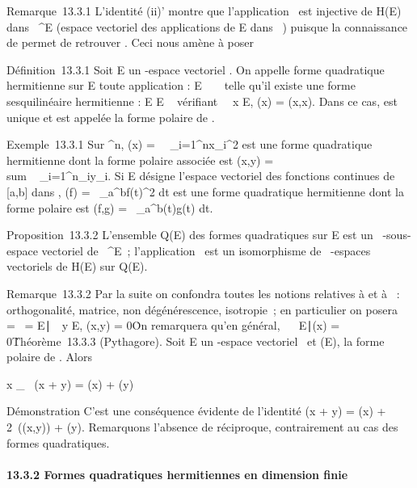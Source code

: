 \documentclass[]{article}
\begin{document}
Remarque~13.3.1 L'identité (ii)' montre que l'application
\phi\mapsto~\Phi est injective de H(E) dans ~^E
(espace vectoriel des applications de E dans ~) puisque la connaissance
de \Phi permet de retrouver \phi. Ceci nous amène à poser

Définition~13.3.1 Soit E un -espace vectoriel . On appelle forme
quadratique hermitienne sur E toute application \Phi : E \rightarrow~ ~ telle qu'il
existe une forme sesquilinéaire hermitienne \phi : E \times E \rightarrow~  vérifiant
\forall~~x \in E, \Phi(x) = \phi(x,x). Dans ce cas, \phi est
unique et est appelée la forme polaire de \Phi.

Exemple~13.3.1 Sur ^n, \Phi(x) =\
\sum ~
_i=1^nx_i^2 est
une forme quadratique hermitienne dont la forme polaire associée est
\phi(x,y) = \\sum ~
_i=1^n\overlinex_iy_i.
Si E désigne l'espace vectoriel des fonctions continues de [a,b]
dans \mathbb{C}, \Phi(f) =\int ~
_a^bf(t)^2 dt est une forme
quadratique hermitienne dont la forme polaire est \phi(f,g)
=\int ~
_a^b\overlinef(t)g(t) dt.

Proposition~13.3.2 L'ensemble Q(E) des formes quadratiques sur E est un
~-sous-espace vectoriel de ~^E~; l'application
\phi\mapsto~\Phi est un isomorphisme de \mathbb{R}~-espaces
vectoriels de H(E) sur Q(E).

Remarque~13.3.2 Par la suite on confondra toutes les notions relatives à
\phi et à \Phi~: orthogonalité, matrice, non dégénérescence, isotropie~; en
particulier on posera
\mathrmKer~\Phi
= \mathrmKer~\phi =
\x \in
E∣\forall~~y \in E, \phi(x,y) =
0\. On remarquera qu'en général,
\mathrmKer\Phi\mathrel\neq~~\x
\in E∣\Phi(x) = 0\.

Théorème~13.3.3 (Pythagore). Soit E un -espace vectoriel ~et \Phi \inQ(E), \phi
la forme polaire de \Phi. Alors

x \bot_\phiy \rigtharrow~ \Phi(x + y) = \Phi(x) + \Phi(y)

Démonstration C'est une conséquence évidente de l'identité \Phi(x + y) =
\Phi(x) + 2\mathrmRe~(\phi(x,y)) +
\Phi(y). Remarquons l'absence de réciproque, contrairement au cas des
formes quadratiques.

\paragraph{13.3.2 Formes quadratiques hermitiennes en dimension finie}
\end{document}
